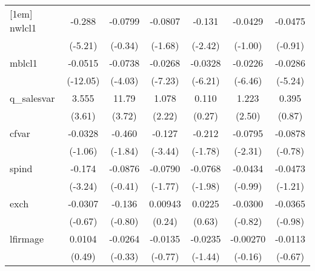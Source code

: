 \begin{table}[htbp]
\begin{tabular}{l*{6}{c}}
[1em]
nwlcl1      &      -0.288\sym{***}&     -0.0799         &     -0.0807         &      -0.131\sym{*}  &     -0.0429         &     -0.0475         \\
            &     (-5.21)         &     (-0.34)         &     (-1.68)         &     (-2.42)         &     (-1.00)         &     (-0.91)         \\
[1em]
mblcl1      &     -0.0515\sym{***}&     -0.0738\sym{***}&     -0.0268\sym{***}&     -0.0328\sym{***}&     -0.0226\sym{***}&     -0.0286\sym{***}\\
            &    (-12.05)         &     (-4.03)         &     (-7.23)         &     (-6.21)         &     (-6.46)         &     (-5.24)         \\
[1em]
q\_salesvar  &       3.555\sym{***}&       11.79\sym{***}&       1.078\sym{*}  &       0.110         &       1.223\sym{*}  &       0.395         \\
            &      (3.61)         &      (3.72)         &      (2.22)         &      (0.27)         &      (2.50)         &      (0.87)         \\
[1em]
cfvar       &     -0.0328         &      -0.460         &      -0.127\sym{***}&      -0.212         &     -0.0795\sym{*}  &     -0.0878         \\
            &     (-1.06)         &     (-1.84)         &     (-3.44)         &     (-1.78)         &     (-2.31)         &     (-0.78)         \\
[1em]
spind       &      -0.174\sym{**} &     -0.0876         &     -0.0790         &     -0.0768\sym{*}  &     -0.0434         &     -0.0473         \\
            &     (-3.24)         &     (-0.41)         &     (-1.77)         &     (-1.98)         &     (-0.99)         &     (-1.21)         \\
[1em]
exch        &     -0.0307         &      -0.136         &     0.00943         &      0.0225         &     -0.0300         &     -0.0365         \\
            &     (-0.67)         &     (-0.80)         &      (0.24)         &      (0.63)         &     (-0.82)         &     (-0.98)         \\
[1em]
lfirmage    &      0.0104         &     -0.0264         &     -0.0135         &     -0.0235         &    -0.00270         &     -0.0113         \\
            &      (0.49)         &     (-0.33)         &     (-0.77)         &     (-1.44)         &     (-0.16)         &     (-0.67)         \\

\end{tabular}
\end{table}
